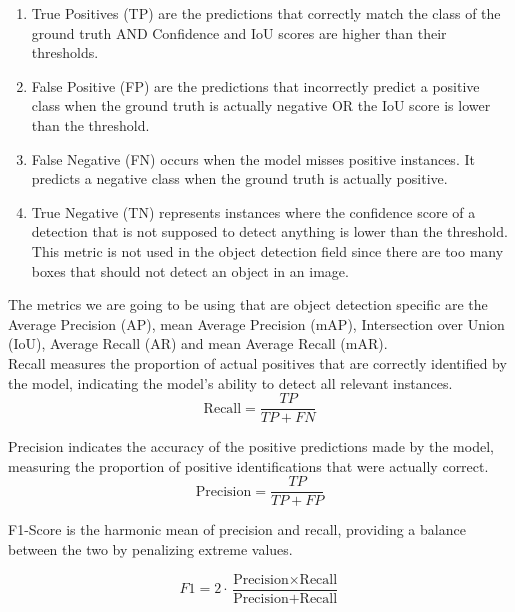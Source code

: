 \begin{enumerate}
    \item True Positives (TP) are the predictions that correctly match the class of the ground truth AND Confidence and IoU scores are 
    higher than their thresholds.
    \item False Positive (FP) are the predictions that incorrectly predict a positive class when the ground truth is actually negative 
    OR the IoU score is lower than the threshold.
    \item False Negative (FN) occurs when the model misses positive instances. It predicts a negative class when the ground truth is actually positive.
    \item True Negative (TN) represents instances where the confidence score of a detection that is not supposed to detect anything is lower than 
    the threshold. This metric is not used in the object detection field since there are too many boxes that should not detect an object in an image.
\end{enumerate}


The metrics we are going to be using that are object detection specific are the Average Precision (AP), mean Average Precision (mAP), Intersection over 
Union (IoU), Average Recall (AR) and mean Average Recall (mAR). \\


Recall \cite{metrics} measures the proportion of actual positives that are correctly identified by the model, indicating the model’s ability to detect all relevant instances.
\begin{equation}
    \text{Recall} = \frac{TP}{TP + FN} \tag{16}
\end{equation}


Precision \cite{metrics} indicates the accuracy of the positive predictions made by the model, measuring the proportion of positive identifications that were actually correct.
\begin{equation}
    \text{Precision} = \frac{TP}{TP + FP} \tag{17}
\end{equation}

F1-Score \cite{metrics} is the harmonic mean of precision and recall, providing a balance between the two by penalizing extreme values.

\begin{equation}
    F1 = 2 \cdot \frac{\text{Precision} \times \text{Recall}}{\text{Precision} + \text{Recall}} \tag{18}
\end{equation}


